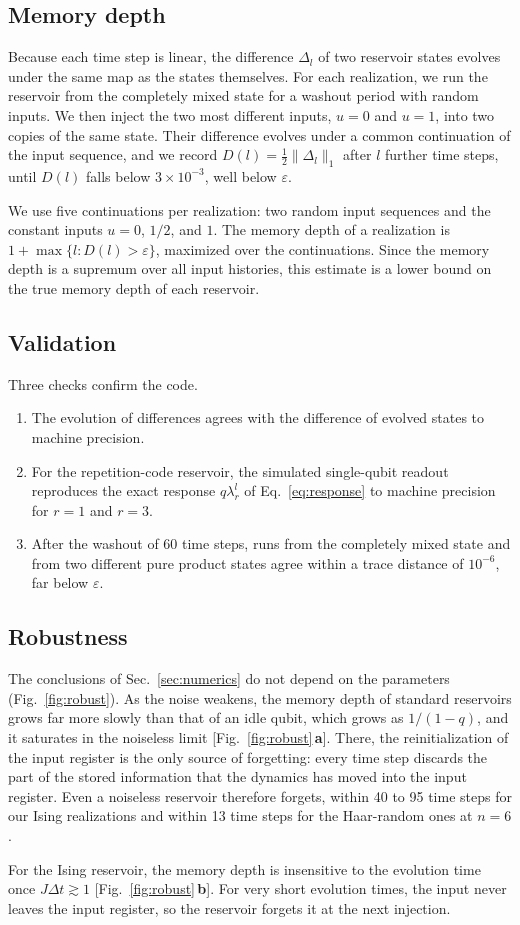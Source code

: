 \documentclass[aps,pra,reprint,superscriptaddress,floatfix]{revtex4-2}
\theoremstyle{plain}
\newcommand{\Norm}[1]{\lVert #1\rVert}
\newcommand{\pnl}[1]{\textsf{\textbf{#1}}}
\begin{document}
\subsection{Memory depth}

Because each time step is linear, the difference $\Delta_l$ of two reservoir states evolves under the same map as the states themselves. For each realization, we run the reservoir from the completely mixed state for a washout period with random inputs. We then inject the two most different inputs, $u=0$ and $u=1$, into two copies of the same state. Their difference evolves under a common continuation of the input sequence, and we record $D(l)=\frac12\Norm{\Delta_l}_1$ after $l$ further time steps, until $D(l)$ falls below $3\times10^{-3}$, well below $\varepsilon$.

We use five continuations per realization: two random input sequences and the constant inputs $u=0$, $1/2$, and $1$. The memory depth of a realization is $1+\max\{l:D(l)>\varepsilon\}$, maximized over the continuations. Since the memory depth is a supremum over all input histories, this estimate is a lower bound on the true memory depth of each reservoir.

\subsection{Validation}

Three checks confirm the code.
\begin{enumerate}
\item The evolution of differences agrees with the difference of evolved states to machine precision.
\item For the repetition-code reservoir, the simulated single-qubit readout reproduces the exact response $q\lambda_r^l$ of Eq.~\eqref{eq:response} to machine precision for $r=1$ and $r=3$.
\item After the washout of 60 time steps, runs from the completely mixed state and from two different pure product states agree within a trace distance of $10^{-6}$, far below $\varepsilon$.
\end{enumerate}

\subsection{Robustness}

The conclusions of Sec.~\ref{sec:numerics} do not depend on the parameters (Fig.~\ref{fig:robust}). As the noise weakens, the memory depth of standard reservoirs grows far more slowly than that of an idle qubit, which grows as $1/(1-q)$, and it saturates in the noiseless limit [Fig.~\ref{fig:robust}\,\pnl{a}]. There, the reinitialization of the input register is the only source of forgetting: every time step discards the part of the stored information that the dynamics has moved into the input register. Even a noiseless reservoir therefore forgets, within 40 to 95 time steps for our Ising realizations and within 13 time steps for the Haar-random ones at $n=6$.

For the Ising reservoir, the memory depth is insensitive to the evolution time once $J\Delta t\gtrsim1$ [Fig.~\ref{fig:robust}\,\pnl{b}]. For very short evolution times, the input never leaves the input register, so the reservoir forgets it at the next injection.



\end{document}
